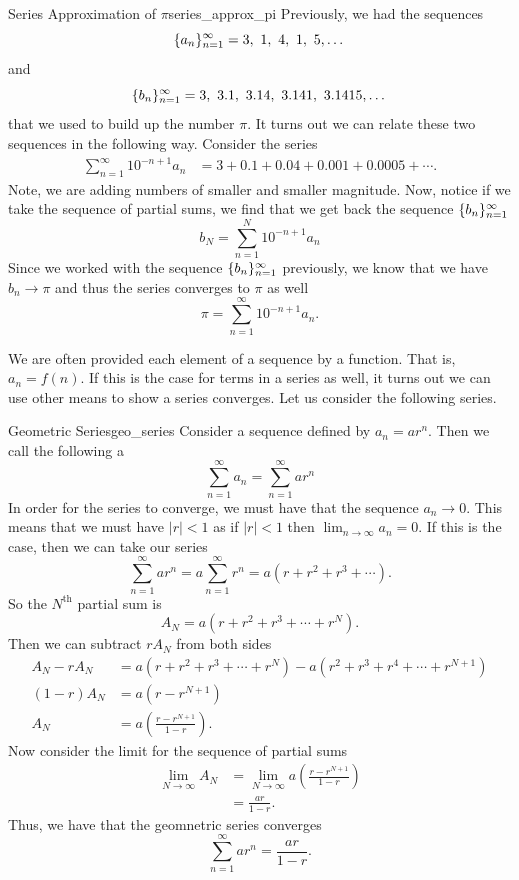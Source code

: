 \begin{ex}{Series Approximation of $\pi$}{series_approx_pi}
Previously, we had the sequences
\[
\{a_n\}_{n=1}^\infty = 3,~1,~4,~1,~5, \dots
\]
and
\[
\{b_n\}_{n=1}^\infty = 3,~3.1,~3.14,~3.141,~3.1415,\dots
\]
that we used to build up the number $\pi$.  It turns out we can relate these two sequences in the following way.  Consider the series
\begin{align*}
\sum_{n=1}^\infty 10^{-n+1} a_n &= 3+0.1+0.04+0.001+0.0005+\cdots.
\end{align*}
Note, we are adding numbers of smaller and smaller magnitude. Now, notice if we take the sequence of partial sums, we find that we get back the sequence $\{b_n\}_{n=1}^\infty$
\[
b_N = \sum_{n=1}^N 10^{-n+1}a_n
\]
Since we worked with the sequence $\{b_n\}_{n=1}^\infty$ previously, we know that we have $b_n\to \pi$ and thus the series converges to $\pi$ as well
\[
\pi = \sum_{n=1}^\infty 10^{-n+1}a_n.
\]
\end{ex}

We are often provided each element of a sequence by a function. That is, $a_n=f(n)$.  If this is the case for terms in a series as well, it turns out we can use other means to show a series converges.  Let us consider the following series.

\begin{ex}{Geometric Series}{geo_series}
Consider a sequence defined by $a_n = ar^n$.  Then we call the following a 
\[
\sum_{n=1}^\infty a_n = \sum_{n=1}^\infty ar^n
\]
In order for the series to converge, we must have that the sequence $a_n \to 0$.  This means that we must have $|r|<1$ as if $|r|<1$ then $\lim_{n\to \infty} a_n =0$. If this is the case, then we can take our series
\[
\sum_{n=1}^\infty ar^n = a\sum_{n=1}^\infty r^n = a(r+r^2+r^3+\cdots).
\]
So the $N^\textrm{th}$ partial sum is
\[
A_{N} = a(r+r^2+r^3+\cdots+r^{N}).
\]
Then we can subtract $rA_N$ from both sides
\begin{align*}
A_N - rA_N &= a(r+r^2+r^3+\cdots+r^N) - a(r^2+r^3+r^4+\cdots+r^{N+1})\\
 (1-r)A_N&=a(r-r^{N+1})\\
 A_N &= a\left( \frac{r-r^{N+1}}{1-r}\right).
\end{align*}
Now consider the limit for the sequence of partial sums
\begin{align*}
\lim_{N\to \infty} A_N &= \lim_{N \to \infty} a\left(\frac{r-r^{N+1}}{1-r}\right)\\
&=\frac{ar}{1-r}.
\end{align*}
Thus, we have that the geomnetric series converges
\[
\boxed{\sum_{n=1}^\infty ar^n = \frac{ar}{1-r}.}
\]
\end{ex}

